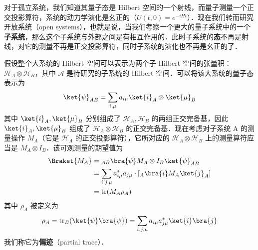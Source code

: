 

对于孤立系统，我们知道其量子态是 Hilbert 空间的一个射线，而量子测量一个正交投影算符，系统的动力学演化是幺正的（$U(t,0)=e^{-iHt}$）．现在我们转而研究开放系统（open systems），也就是说，当我们考察一个更大的量子系统中的一个\textbf{子系统}，那么这个子系统与外部之间是有相互作用的．此时子系统的\textbf{态}不再是射线，对它的测量不再是正交投影算符，同时子系统的演化也不再是幺正的了．

假设整个大系统的 Hilbert 空间可以表示为两个子 Hilbert 空间的张量积：$\mathcal{H}_A\otimes \mathcal{H}_B$，其中 $\mathcal A$ 是待研究的子系统的 Hilbert 空间．可以将该大系统的量子态表示为
\begin{equation}
\ket{\psi}_{AB}=\sum_{i,\mu}a_{i\mu}\ket{i}_A\otimes \ket{\mu}_B
\end{equation}
其中 $\ket{i}_A,\ket{\mu}_B$ 分别组成了 $\mathcal{H}_A, \mathcal{H}_B$ 的两组正交完备基，因此 $\ket{i}_A,\ket{\mu}_B$ 组成了 $\mathcal{H}_A\otimes \mathcal{H}_B$ 的正交完备基．现在考虑对子系统 A 的测量操作 $M_A$（它是 $\mathcal H_A$ 的正交投影算符），它所对应的 $\mathcal{H}_A\otimes \mathcal{H}_B$ 上的测量算符应当是 $M_A\otimes I_B$．该可观测量的期望值为
\begin{equation}
\begin{aligned}
\Braket{M_A}&={}_{AB}\bra{\psi}M_A\otimes I_B \ket{\psi}_{AB}\\
&=\sum_{i,j,\mu}a_{i\mu}^*a_{j\mu} \cdot [{}_A\bra{i} M_A \ket{j}_A]\\
&=\text{tr}(M_A \rho_A)
\end{aligned}
\end{equation}
其中 $\rho_A$ 被定义为
\begin{equation}
\rho_A=\text{tr}_B(\ket{\psi}\bra{\psi})=\sum_{i,j,\mu}a_{i\mu}a_{j\mu}^*\ket{i}\bra{j}
\end{equation}
我们称它为\textbf{偏迹}（partial trace）．
